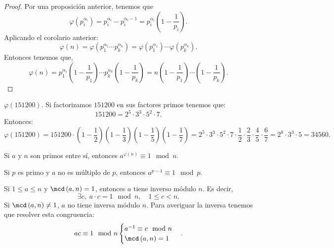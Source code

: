 \begin{proof}
Por una proposición anterior, tenemos que 
\[\varphi\left(p_{i}^{\alpha_{i}}\right) = p_{i}^{\alpha_{i}}-p_{i}^{\alpha_{i}-1} = p_{i}^{\alpha_{i}}\left(1-\frac{1}{p_{i}}\right) .\]
Aplicando el corolario anterior:
\[\varphi\left(n\right) = \varphi\left(p_{1}^{\alpha_{1}} \cdots p_{k}^{\alpha_{k}}\right) = \varphi\left(p_{1}^{\alpha_{1}}\right)\cdots\varphi\left(p_{k}^{\alpha_{k}}\right) .\]
Entonces tenemos que, 
\[\varphi\left(n\right) = p_{1}^{\alpha_{1}}\left(1 - \frac{1}{p_{1}}\right) \cdots p_{k}^{\alpha_{k}}\left(1 - \frac{1}{p_{k}}\right) = n \left(1-\frac{1}{p_{1}}\right)\cdots\left(1 - \frac{1}{p_{k}}\right) .\]
\end{proof}

\begin{eg}
\normalfont $\displaystyle \varphi\left(151200\right) $. Si factorizamos $\displaystyle 151200 $ en sus factores primos tenemos que:
\[151200 = 2^{5} \cdot 3^{3} \cdot 5^{2} \cdot 7 .\]
Entonces:
\[\varphi\left(151200\right) = 151200 \cdot \left(1-\frac{1}{2}\right)\left(1-\frac{1}{3}\right)\left(1-\frac{1}{5}\right)\left(1-\frac{1}{7}\right) =2^{5} \cdot 3^{3} \cdot 5^{2} \cdot 7 \cdot \frac{1}{2} \cdot \frac{2}{3} \cdot \frac{4}{5} \cdot \frac{6}{7} = 2^{8} \cdot 3^{3} \cdot 5 = 34560.\]
\end{eg}

\begin{ftheorem}
\normalfont Si $\displaystyle a $ y $\displaystyle n $ son primos entre sí, entonces $\displaystyle a^{\varphi\left(n\right)} \equiv 1 \mod n $. 
\end{ftheorem}

\begin{fcolorary}
\normalfont Si $\displaystyle p $ es primo y $\displaystyle a $ no es múltiplo de $\displaystyle p $, entonces $\displaystyle a^{p-1} \equiv 1 \mod p $.
\end{fcolorary}

\begin{ftheorem}
\normalfont Si $\displaystyle 1 \leq a \leq n $ y $\displaystyle \mcd\left(a,n\right) = 1 $, entonces $\displaystyle a  $ tiene inverso módulo $\displaystyle n $. Es decir, 
\[\exists c, \; a \cdot c = 1 \mod n, \quad 1 \leq c < n .\]
Si $\displaystyle \mcd\left(a,n\right) \neq 1 $, $\displaystyle a $ no tiene inversa módulo $\displaystyle n $. Para averiguar la inversa tenemos que resolver esta congruencia: 
\[ac \equiv 1 \mod n
\begin{cases}
a^{-1} \equiv c \mod n \\
\mcd\left(a,n\right) = 1
\end{cases}
.\]
\end{ftheorem}

